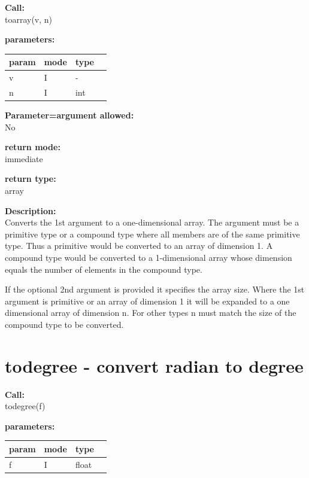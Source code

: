         {\bf Call:} \\
        toarray(v, n)
        
        {\bf parameters:} \\
        \begin{tabular}{| l | l | l | l |}
        \hline
        param  & mode & type & \\
        \hline \hline
        v & I &  -  & \\ \hline
        n & I & int & \\ \hline
        \end{tabular}
        
        {\bf Parameter=argument allowed:} \\
        No
        
        {\bf return mode:} \\
        immediate

        {\bf return type:} \\
        array
        
        {\bf Description:} \\
        Converts the 1st argument to a one-dimensional array.
        The argument must be a primitive type or a compound type where
        all members are of the same primitive type. Thus a primitive would be
        converted to an array of dimension 1. A compound type would be converted
        to a 1-dimensional array whose dimension equals the number of elements
        in the compound type.
        
        If the optional 2nd argument is provided it specifies the array size.
        Where the 1st argument is primitive or an array of dimension 1 it
        will be expanded to a one dimensional array of dimension n.
        For other types n must match the size of the compound type to be
        converted.
        


    \section{todegree - convert radian to degree}\label{sec:iftodegree}
            
        {\bf Call:} \\
        todegree(f)
        
        {\bf parameters:} \\
        \begin{tabular}{| l | l | l | l |}
        \hline
        param  & mode & type & \\
        \hline \hline
        f & I & float & \\ \hline
        \end{tabular}
        
